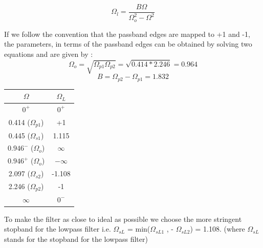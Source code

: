 \documentclass{article}
\begin{document}
\begin{equation*}
    \Omega_l = \frac{B\Omega}{ \Omega_o^2 - \Omega^2}
\end{equation*}

\vspace{1em}
\noindent
If we follow the convention that the passband edges are mapped to +1 and -1, the parameters, in terms of the passband edges can be obtained by solving two equations and are given by :
\begin{equation*}
    \Omega_o = \sqrt{\Omega_{p1} \Omega_{p2}} = \sqrt{0.414*2.246} = 0.964
\end{equation*}\begin{equation*}
    B = \Omega_{p2}  - \Omega_{p1} = 1.832
\end{equation*}

\begin{table}[H]
    \begin{center}
    \begin{tabular}{|c|c|}
        \hline
        $\Omega$ & $\Omega_L$\\
        
        \hline
            $0^{+}$ & $0^{+}$\\
            \hline
            0.414 ($\Omega_{p1}$) & +1 \\
            \hline
            0.445 ($\Omega_{s1}$) & 1.115\\
            \hline
            $0.946^{-}$ ($\Omega_o$) & $\infty$\\
            \hline
            $0.946^{+}$ ($\Omega_o$) & $-\infty$\\
            \hline
            2.097 ($\Omega_{s2}$)  & -1.108\\
            \hline
            2.246 ($\Omega_{p2}$) & -1\\
            \hline
            $\infty$ & $0^{-}$\\
            \hline
        
    \end{tabular}
    \end{center}
\end{table}

\vspace{1em}
\noindent
To make the filter as close to ideal as possible we choose the more stringent stopband for the lowpass filter i.e. $\Omega_{sL}$ = min($\Omega_{sL1}$ , - $\Omega_{sL2}$) = 1.108. (where $\Omega_{sL}$ stands for the stopband for the lowpass filter)
\end{document}
